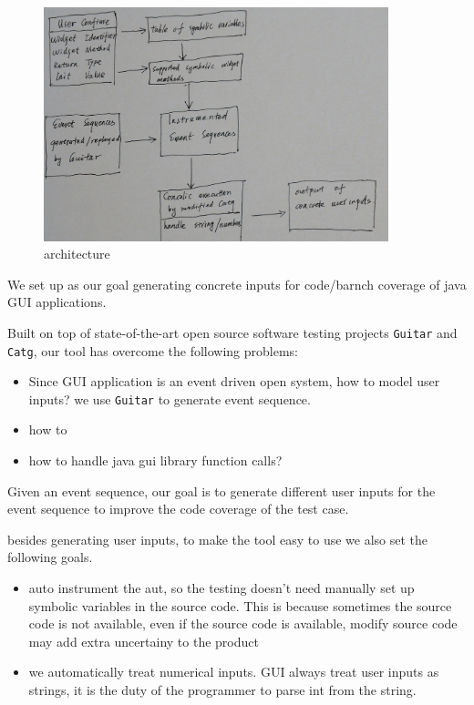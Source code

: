 \documentclass{article}
\begin{document}
\begin{figure}
  \centering
  \includegraphics[width=100mm,scale=0.5]{./res/archi-hand.jpg}
  \caption{architecture}
  \label{figure:architecture}
\end{figure}



We set up as our goal generating concrete inputs for code/barnch coverage of java GUI applications.

Built on top of state-of-the-art open source software testing projects \texttt{Guitar} and \texttt{Catg}, our tool has overcome the following problems:
\begin{itemize}
  \item {Since GUI application is an event driven open system, how to model user inputs? we use \texttt{Guitar} to generate event sequence.}
    \item{how to }
    \item{how to handle java gui library function calls?}
\end{itemize}

Given an event sequence, our goal is to generate different user inputs for the event sequence to improve the code coverage of the test case.

besides generating user inputs, to make the tool easy to use we also set the following goals.
\begin{itemize}
  \item {auto instrument the aut, so the testing doesn't need manually set up symbolic variables in the source code. This is because sometimes the source code is not available, even if the source code is available, modify source code may add extra uncertainy to the product }
    \item{we automatically treat numerical inputs. GUI always treat user inputs as strings, it is the duty of the programmer to parse int from the string. }
\end{itemize}
\end{document}
